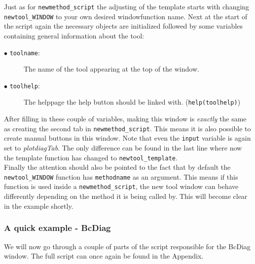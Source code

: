 \documentclass[a4paper]{article}\usepackage[]{graphicx}\usepackage[]{color}
\begin{document}
\noindent Just as for \verb|newmethod_script| the adjusting of the template
starts with changing \verb|newtool_WINDOW| to your own desired windowfunction
name. Next at the start of the script again the necessary objects are
initialized followed by some variables containing general information about the
tool:
\begin{description}
  \item[$\bullet$ \texttt{toolname}:] The name of the tool appearing at the top
  of the window. 
  \item[$\bullet$ \texttt{toolhelp}:] The helppage the help button should be
  linked with. (\verb|help(toolhelp)|)
\end{description}
\noindent After filling in these couple of variables, making this window is {\it
exactly} the same as creating the second tab in \verb|newmethod_script|. This
means it is also possible to create manual buttons in this window. Note that
even the \verb|input| variable is again set to {\it plotdiagTab}. The only
difference can be found in the last line where now the template function has
changed to \verb|newtool_template|.\\
Finally the attention should also be pointed to the fact that by default the
\verb|newtool_WINDOW| function has \verb|methodname| as an argument. This means
if this function is used inside a \verb|newmethod_script|, the new tool window
can behave differently depending on the method it is being called by. This will
become clear in the example shortly. 

\subsubsection{A quick example - BcDiag}
\noindent We will now go through a couple of parts of the script responsible for
the BcDiag window. The full script can once again be found in the Appendix.
\end{document}
